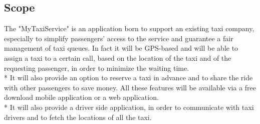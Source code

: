 \subsection{Scope}
The "MyTaxiService" is an application born to support an existing taxi company, especially to simplify passengers’ access to the service and guarantee a fair management of taxi queues. In fact it will be GPS-based and will be able to assign a taxi to a certain call, based on the location of the taxi and of the requesting passenger, in order to minimize the waiting time.\\*
It will also provide an option to reserve a taxi in advance and to share the ride with other passengers to save money. All these features will be available via a free download mobile application or a web application.\\*
It will also provide a driver side application, in order to communicate with taxi drivers and to fetch the locations of all the taxi.
